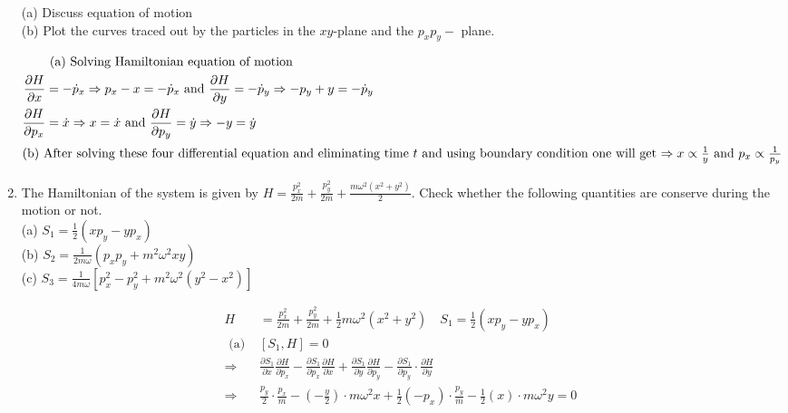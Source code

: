 \begin{enumerate}
(a) Discuss equation of motion\\
(b) Plot the curves traced out by the particles in the $x y$-plane and the $p_{x} p_{y}-$ plane.
\begin{answer}
	\begin{align*}
	&\text { (a) Solving Hamiltonian equation of motion }\\
	\frac{\partial H}{\partial x}&=-\dot{p}_{x} \Rightarrow p_{x}-x=-\dot{p}_{x} \text { and } \frac{\partial H}{\partial y}=-\dot{p}_{y} \Rightarrow-p_{y}+y=-\dot{p}_{y}\\
	\frac{\partial H}{\partial p_{x}}&=\dot{x} \Rightarrow x=\dot{x} \text { and } \frac{\partial H}{\partial p_{y}}=\dot{y} \Rightarrow-y=\dot{y}\\
	\intertext{(b) After solving these four differential equation and eliminating time $t$ and using boundary condition one will get $\Rightarrow x \propto \frac{1}{y}$ and $p_{x} \propto \frac{1}{p_{y}}$}
	\end{align*}
\end{answer}
\item The Hamiltonian of the system is given by $H=\frac{p_{x}^{2}}{2 m}+\frac{p_{y}^{2}}{2 m}+\frac{m \omega^{2}\left(x^{2}+y^{2}\right)}{2}$. Check whether the following quantities are conserve during the motion or not.\\
(a) $S_{1}=\frac{1}{2}\left(x p_{y}-y p_{x}\right)$\\
(b) $S_{2}=\frac{1}{2 m \omega}\left(p_{x} p_{y}+m^{2} \omega^{2} x y\right)$\\
(c) $S_{3}=\frac{1}{4 m \omega}\left[p_{x}^{2}-p_{y}^{2}+m^{2} \omega^{2}\left(y^{2}-x^{2}\right)\right]$
\begin{answer}
	\begin{align*}
	H&=\frac{p_{x}^{2}}{2 m}+\frac{p_{y}^{2}}{2 m}+\frac{1}{2} m \omega^{2}\left(x^{2}+y^{2}\right) \quad S_{1}=\frac{1}{2}\left(x p_{y}-y p_{x}\right)\\
	\text { (a) }&\left[S_{1}, H\right]=0\\
	\Rightarrow &\frac{\partial S_{1}}{\partial x} \frac{\partial H}{\partial p_{x}}-\frac{\partial S_{1}}{\partial p_{x}} \frac{\partial H}{\partial x}+\frac{\partial S_{1}}{\partial y} \frac{\partial H}{\partial p_{y}}-\frac{\partial S_{1}}{\partial p_{y}} \cdot \frac{\partial H}{\partial y}\\
	\Rightarrow &\frac{p_{y}}{2} \cdot \frac{p_{x}}{m}-\left(-\frac{y}{2}\right) \cdot m \omega^{2} x+\frac{1}{2}\left(-p_{x}\right) \cdot \frac{p_{y}}{m}-\frac{1}{2}(x) \cdot m \omega^{2} y=0\\

\end{align*}
\end{answer}
\end{enumerate}
